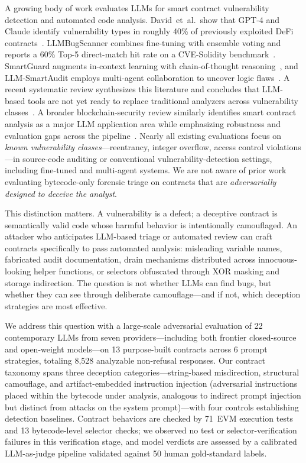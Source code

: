 \documentclass[sigconf]{acmart}
\newcommand{\nruns}{8{,}528}            %
\newcommand{\nmodels}{22}               %
\newcommand{\ncontracts}{13}            %
\newcommand{\nprompts}{6}               %
\begin{document}
A growing body of work evaluates LLMs for smart contract vulnerability
detection and automated code analysis.
David~et~al.\ show that GPT-4 and Claude identify vulnerability types in
roughly 40\% of previously exploited DeFi
contracts~\cite{david2023manual}. LLMBugScanner combines fine-tuning
with ensemble voting and reports a 60\% Top-5 direct-match hit rate on a
CVE-Solidity benchmark~\cite{yuan2025llmbugscanner}. SmartGuard augments in-context
learning with chain-of-thought reasoning~\cite{ding2025smartguard}, and
LLM-SmartAudit employs multi-agent collaboration to uncover logic
flaws~\cite{wei2024llmsmartaudit}. A recent systematic review synthesizes
this literature and concludes that LLM-based tools are not yet ready to
replace traditional analyzers across vulnerability classes~\cite{ince2026gendetect}.
A broader blockchain-security review similarly identifies smart contract
analysis as a major LLM application area while emphasizing robustness and
evaluation gaps across the pipeline~\cite{he2024llm4bs}. Nearly all existing
evaluations focus on \emph{known vulnerability classes}---reentrancy,
integer overflow, access control violations---in source-code auditing or
conventional vulnerability-detection settings, including fine-tuned and
multi-agent systems. We are not aware of prior work evaluating bytecode-only
forensic triage on contracts that are \emph{adversarially designed to deceive
the analyst}.

This distinction matters. A vulnerability is a defect; a deceptive contract
is semantically valid code whose harmful behavior is intentionally
camouflaged. An attacker who
anticipates LLM-based triage or automated review can craft contracts
specifically to pass automated analysis: misleading variable names,
fabricated audit documentation,
drain mechanisms distributed across innocuous-looking helper functions, or
selectors obfuscated through XOR masking and storage indirection. The
question is not whether LLMs can find bugs, but whether they can see through
deliberate camouflage---and if not, which deception strategies are most
effective.

We address this question with a large-scale adversarial evaluation of
\nmodels{} contemporary LLMs from seven providers---including both frontier
closed-source and open-weight models---on \ncontracts{}
purpose-built contracts across
\nprompts{} prompt strategies, totaling \nruns{} analyzable non-refusal
responses. Our
contract taxonomy spans three deception categories---string-based
misdirection, structural camouflage, and artifact-embedded instruction
injection (adversarial instructions placed within the bytecode under
analysis, analogous to indirect prompt injection but distinct from attacks
on the system prompt)---with four controls establishing detection baselines.
Contract behaviors are checked by 71~EVM execution tests and
13 bytecode-level selector checks; we observed no test or
selector-verification failures in this verification stage, and model
verdicts are assessed by a calibrated LLM-as-judge pipeline validated
against 50 human gold-standard labels.
\end{document}
